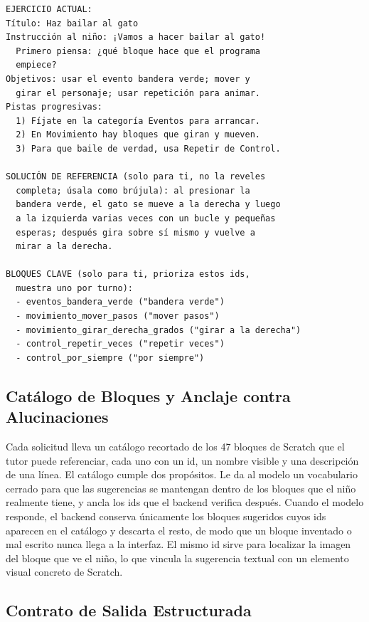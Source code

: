 \documentclass[conference]{IEEEtran}
\begin{document}
\begin{lstlisting}[style=promptbox, caption={Contexto del ejercicio para un juego representativo (los ids de bloque son textuales).}, label={lst:ctx}]
EJERCICIO ACTUAL:
Título: Haz bailar al gato
Instrucción al niño: ¡Vamos a hacer bailar al gato!
  Primero piensa: ¿qué bloque hace que el programa
  empiece?
Objetivos: usar el evento bandera verde; mover y
  girar el personaje; usar repetición para animar.
Pistas progresivas:
  1) Fíjate en la categoría Eventos para arrancar.
  2) En Movimiento hay bloques que giran y mueven.
  3) Para que baile de verdad, usa Repetir de Control.

SOLUCIÓN DE REFERENCIA (solo para ti, no la reveles
  completa; úsala como brújula): al presionar la
  bandera verde, el gato se mueve a la derecha y luego
  a la izquierda varias veces con un bucle y pequeñas
  esperas; después gira sobre sí mismo y vuelve a
  mirar a la derecha.

BLOQUES CLAVE (solo para ti, prioriza estos ids,
  muestra uno por turno):
  - eventos_bandera_verde ("bandera verde")
  - movimiento_mover_pasos ("mover pasos")
  - movimiento_girar_derecha_grados ("girar a la derecha")
  - control_repetir_veces ("repetir veces")
  - control_por_siempre ("por siempre")
\end{lstlisting}

\subsection{Catálogo de Bloques y Anclaje contra Alucinaciones}

Cada solicitud lleva un catálogo recortado de los 47 bloques de Scratch que el tutor puede referenciar, cada uno con un id, un nombre visible y una descripción de una línea. El catálogo cumple dos propósitos. Le da al modelo un vocabulario cerrado para que las sugerencias se mantengan dentro de los bloques que el niño realmente tiene, y ancla los ids que el backend verifica después. Cuando el modelo responde, el backend conserva únicamente los bloques sugeridos cuyos ids aparecen en el catálogo y descarta el resto, de modo que un bloque inventado o mal escrito nunca llega a la interfaz. El mismo id sirve para localizar la imagen del bloque que ve el niño, lo que vincula la sugerencia textual con un elemento visual concreto de Scratch.

\subsection{Contrato de Salida Estructurada}
\end{document}
